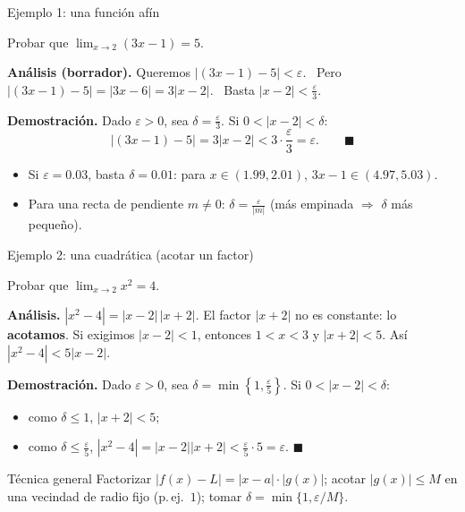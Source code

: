 \documentclass[10pt,aspectratio=169]{beamer}
\begin{document}
\begin{frame}{Ejemplo 1: una función afín}
  \begin{ejemplo}
    Probar que $\displaystyle\lim_{x\to2}(3x-1)=5$.

    \textbf{Análisis (borrador).} Queremos $|(3x-1)-5|<\varepsilon$. \ Pero $|(3x-1)-5|=|3x-6|=3|x-2|$.
    \ Basta $|x-2|<\frac\varepsilon3$.
    \smallskip

    \textbf{Demostración.} Dado $\varepsilon>0$, sea $\delta=\frac\varepsilon3$. Si $0<|x-2|<\delta$:
    \[ |(3x-1)-5|=3|x-2|<3\cdot\frac\varepsilon3=\varepsilon.\qquad\blacksquare \]
  \end{ejemplo}
  \begin{observacion}
    \begin{itemize}
      \item Si $\varepsilon=0.03$, basta $\delta=0.01$: para $x\in(1.99,2.01)$, $3x-1\in(4.97,5.03)$.
      \item Para una recta de pendiente $m\neq0$: $\delta=\frac{\varepsilon}{|m|}$ (más empinada $\Rightarrow$ $\delta$ más pequeño).
    \end{itemize}
  \end{observacion}
\end{frame}

\begin{frame}{Ejemplo 2: una cuadrática (acotar un factor)}
  \begin{ejemplo}
    Probar que $\displaystyle\lim_{x\to2}x^2=4$.

    \textbf{Análisis.} $|x^2-4|=|x-2|\,|x+2|$. El factor $|x+2|$ no es constante: lo \textbf{acotamos}.
    Si exigimos $|x-2|<1$, entonces $1<x<3$ y $|x+2|<5$. Así $|x^2-4|<5|x-2|$.
    \smallskip

    \textbf{Demostración.} Dado $\varepsilon>0$, sea $\delta=\min\left\{1,\frac\varepsilon5\right\}$. Si $0<|x-2|<\delta$:
    \begin{itemize}
      \item como $\delta\le1$, $|x+2|<5$;
      \item como $\delta\le\frac\varepsilon5$, $|x^2-4|=|x-2||x+2|<\frac\varepsilon5\cdot5=\varepsilon$. \quad $\blacksquare$
    \end{itemize}
  \end{ejemplo}
  \begin{block}{Técnica general}
    Factorizar $|f(x)-L|=|x-a|\cdot|g(x)|$; acotar $|g(x)|\le M$ en una vecindad de radio fijo (p.\,ej.\ $1$); tomar
    $\delta=\min\{1,\varepsilon/M\}$.
  \end{block}
\end{frame}
\end{document}
